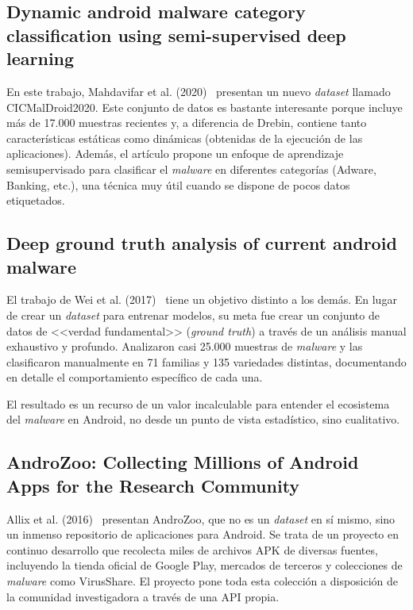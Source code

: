\subsection{Dynamic android malware category classification using semi-supervised deep learning}

En este trabajo, Mahdavifar et al. (2020)~\cite{mahdavifar2020dynamic} presentan un nuevo \textit{dataset} llamado CICMalDroid2020. Este conjunto de datos es bastante interesante porque incluye más de 17.000 muestras recientes y, a diferencia de Drebin, contiene tanto características estáticas como dinámicas (obtenidas de la ejecución de las aplicaciones). Además, el artículo propone un enfoque de aprendizaje semisupervisado para clasificar el \textit{malware} en diferentes categorías (Adware, Banking, etc.), una técnica muy útil cuando se dispone de pocos datos etiquetados.

\subsection{Deep ground truth analysis of current android malware}
El trabajo de Wei et al. (2017)~\cite{wei2017deep} tiene un objetivo distinto a los demás. En lugar de crear un \textit{dataset} para entrenar modelos, su meta fue crear un conjunto de datos de <<verdad fundamental>> (\textit{ground truth}) a través de un análisis manual exhaustivo y profundo. Analizaron casi 25.000 muestras de \textit{malware} y las clasificaron manualmente en 71 familias y 135 variedades distintas, documentando en detalle el comportamiento específico de cada una.

El resultado es un recurso de un valor incalculable para entender el ecosistema del \textit{malware} en Android, no desde un punto de vista estadístico, sino cualitativo.

\subsection{AndroZoo: Collecting Millions of Android Apps for the Research Community}
Allix et al. (2016)~\cite{Allix:2016:ACM:2901739.2903508} presentan AndroZoo, que no es un \textit{dataset} en sí mismo, sino un inmenso repositorio de aplicaciones para Android. Se trata de un proyecto en continuo desarrollo que recolecta miles de archivos APK de diversas fuentes, incluyendo la tienda oficial de Google Play, mercados de terceros y colecciones de \textit{malware} como VirusShare. El proyecto pone toda esta colección a disposición de la comunidad investigadora a través de una API propia.

